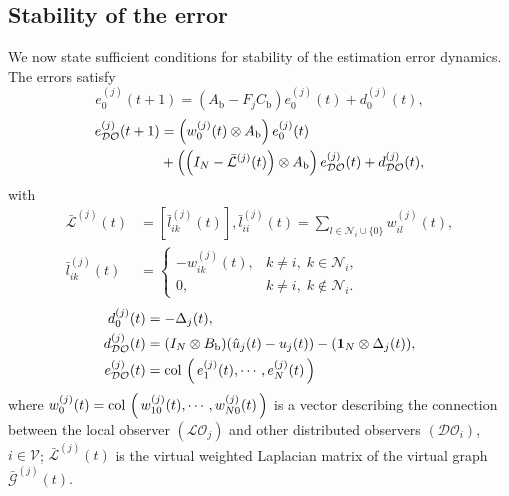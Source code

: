 \documentclass{ifacconf}
\def\col#1{\mathop{{\rm col}\,\left(\,#1\,\right)}}
\def\V{\mathcal{V}} %
\def\G{\mathcal{G}} %
\def\L{\mathcal{L}} %
\def\N{\mathcal{N}} %
\def\LO{\mathcal{LO}} %
\def\DO{\mathcal{DO}} %
\newtheorem{assumption}{\it \textbf{Assumption}}%
\begin{document}
\subsection{Stability of the error}\label{subsec_Prove}
\vspace*{-0.2cm}
We now state sufficient conditions for stability of the estimation error dynamics. The errors satisfy
%
\begin{equation}\label{eq_e0}
   e_0^{(j)}(t+1) = \left( A_{\text{b}} - F_{j} C_{\text{b}}  \right) e_0^{(j)}(t) + d_0^{(j)}(t),    
\end{equation}
{\small
    \begin{align}\label{eq_error}
        e_{\DO}^{(j)}(t+1) &= \left( w_{0}^{(j)}(t) \otimes A_{\text{b}} \right) e_0^{(j)}(t)  \notag\\ 
        &+ \left( \left( I_{N} - \bar{\L}^{(j)}(t)  \right)  \otimes  A_{\text{b}} \right) e_{\DO}^{(j)}(t) + d_{\DO}^{(j)}(t),
    \end{align}
}
with
{\small
\begin{align*}
    \bar{\L}^{(j)}(t)&=\left[\bar{l}_{ik}^{(j)}(t)\right],
    \bar{l}_{ii}^{(j)}(t) =\sum_{l\in \N_i\cup\{0\}} w_{il}^{(j)}(t),\\
    \bar{l}_{ik}^{(j)}(t)&=
    \begin{cases}
    -w_{ik}^{(j)}(t), & k\neq i,\; k\in\N_i,\\
    0, & k\neq i,\; k\notin\N_i.
    \end{cases}
\end{align*}
}
\begin{align*}
    d_0^{(j)}(t) &= - \Delta_j(t), \\
    d_{\DO}^{(j)}(t)  &= (I_N \otimes B_{\text{b}})(\hat{u}_j(t)-u_j(t))  - (\mathbf{1}_N \otimes \Delta_j(t)), \\
    e_{\DO}^{(j)}(t) &= \col{e_1^{(j)}(t), \cdots , e_N^{(j)}(t)}
\end{align*}
%
where 
$w_{0}^{(j)}(t) = \col{w_{10}^{(j)}(t), \cdots, w_{N0}^{(j)}(t)} $ is a vector describing the connection between the local observer $(\LO_{j})$ and other distributed observers $(\DO_{i})$, $i \in \V$; $\bar{\L}^{(j)}(t)$ is the virtual weighted Laplacian matrix of the virtual graph $\bar{\G}^{(j)}(t)$. 
\end{document}
